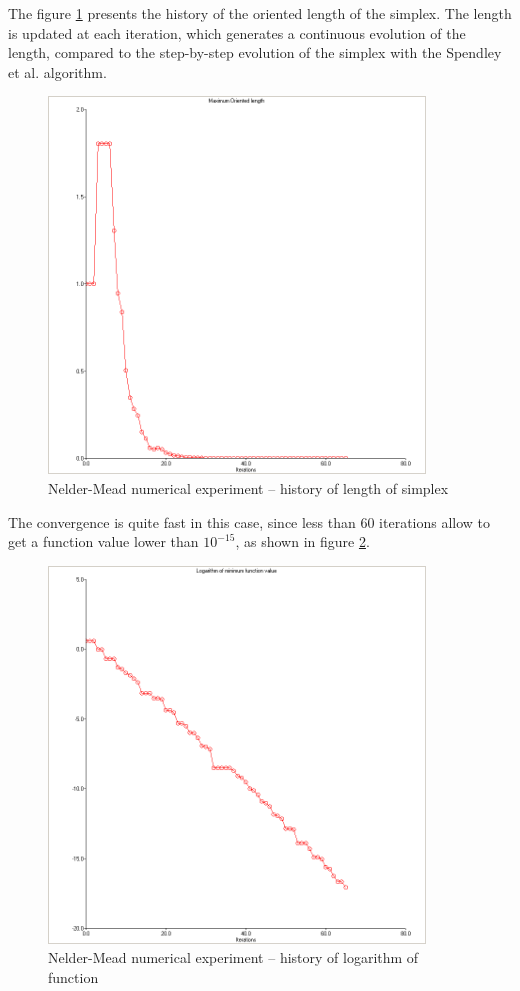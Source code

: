 The figure \ref{fig-nm-numexp1-sigma} presents the history of the oriented
length of the simplex. The length is updated at each iteration, which 
generates a continuous evolution of the length, compared to the 
step-by-step evolution of the simplex with the Spendley et al. algorithm.

\begin{figure}
\begin{center}
\includegraphics[width=10cm]{quad2bis-nm-history-sigma.png}
\end{center}
\caption{Nelder-Mead numerical experiment -- history of length of simplex}
\label{fig-nm-numexp1-sigma}
\end{figure}

The convergence is quite fast in this case, since less than 60 iterations
allow to get a function value lower than $10^{-15}$, as shown in 
figure \ref{fig-nm-numexp1-logfopt}.

\begin{figure}
\begin{center}
\includegraphics[width=10cm]{quad2bis-nm-history-logfopt.png}
\end{center}
\caption{Nelder-Mead numerical experiment -- history of logarithm of function}
\label{fig-nm-numexp1-logfopt}
\end{figure}

